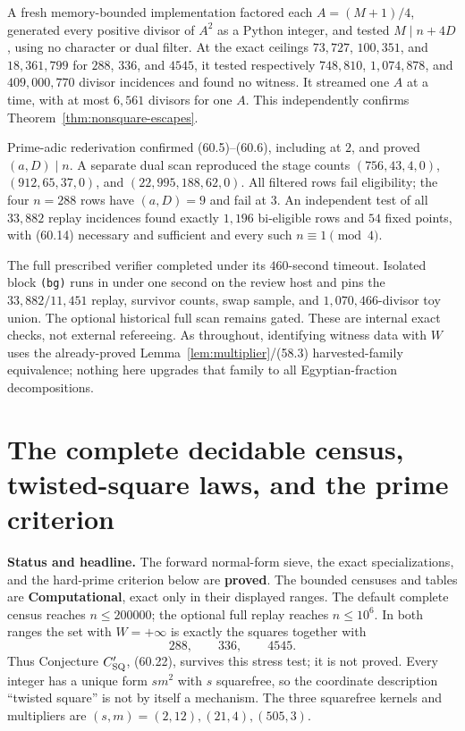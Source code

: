 \documentclass[10pt,reqno]{amsart}
\theoremstyle{definition}
\newcommand{\1}{\mathbf 1}
\begin{document}
A fresh memory-bounded implementation factored each $A=(M+1)/4$, generated
every positive divisor of $A^2$ as a Python integer, and tested
$M\mid n+4D$, using no character or dual filter.  At the exact ceilings
$73{,}727$, $100{,}351$, and $18{,}361{,}799$ for $288$, $336$, and $4545$,
it tested respectively $748{,}810$, $1{,}074{,}878$, and $409{,}000{,}770$
divisor incidences and found no witness.  It streamed one $A$ at a time,
with at most $6{,}561$ divisors for one $A$.  This independently confirms
Theorem~\ref{thm:nonsquare-escapes}.

Prime-adic rederivation confirmed (60.5)--(60.6), including at $2$, and
proved $(a,D)\mid n$.  A separate dual scan reproduced the stage counts
$(756,43,4,0)$, $(912,65,37,0)$, and $(22{,}995,188,62,0)$.  All filtered
rows fail eligibility; the four $n=288$ rows have $(a,D)=9$ and fail at
$3$.  An independent test of all $33{,}882$ replay incidences found exactly
$1{,}196$ bi-eligible rows and $54$ fixed points, with (60.14) necessary and
sufficient and every such $n\equiv1\pmod4$.

The full prescribed verifier completed under its $460$-second timeout.
Isolated block \texttt{(bg)} runs in under one second on the review host and
pins the $33{,}882/11{,}451$ replay, survivor counts, swap sample, and
$1{,}070{,}466$-divisor toy union.  The optional historical full scan remains
gated.  These are internal exact checks, not external refereeing.  As
throughout, identifying witness data with $W$ uses the already-proved
Lemma~\ref{lem:multiplier}/(58.3) harvested-family equivalence; nothing here
upgrades that family to all Egyptian-fraction decompositions.

\section{The complete decidable census, twisted-square laws, and the prime criterion}
\label{sec:decidable-census}
\medskip\noindent\textbf{Status and headline.}
The forward normal-form sieve, the exact specializations, and the hard-prime
criterion below are \textbf{proved}.  The bounded censuses and tables are
\textbf{Computational}, exact only in their displayed ranges.  The default
complete census reaches $n\leq200000$; the optional full replay reaches
$n\leq10^6$.  In both ranges the set with $W=+\infty$ is exactly the
squares together with
\begin{equation}\tag{61.1}
                         288,\qquad336,\qquad4545.
\end{equation}
Thus Conjecture $C_{\rm SQ}'$, (60.22), survives this stress test; it is not
proved.  Every integer has a unique form $sm^2$ with $s$ squarefree, so the
coordinate description ``twisted square'' is not by itself a mechanism.
The three squarefree kernels and multipliers are
$(s,m)=(2,12),(21,4),(505,3)$.
\end{document}

